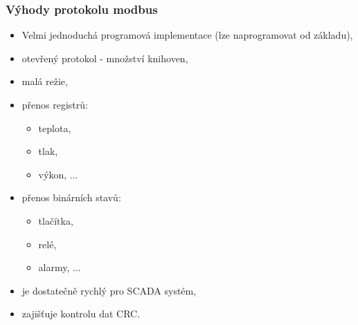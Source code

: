 	\begin{frame}
    \frametitle{Výhody protokolu modbus}
		\small
		\begin{itemize}
			\item Velmi jednoduchá programová implementace (lze naprogramovat od základu),
			\item otevřený protokol - množství knihoven,
			\item malá režie,
			\item přenos registrů:
			
			\begin{itemize}
				\item teplota,
				\item tlak,
				\item výkon, ...
			\end{itemize}
			
			\item přenos binárních stavů:
			
			\begin{itemize}
				\item tlačítka,
				\item relé,
				\item alarmy, ...
			\end{itemize}
			
			\item je dostatečně rychlý pro SCADA systém,
			\item zajišťuje kontrolu dat CRC.
		\end{itemize}
		
	\end{frame}
	
